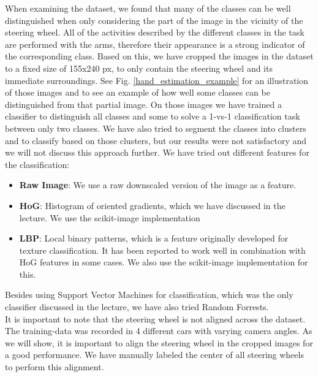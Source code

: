 \documentclass[10pt,twocolumn,letterpaper]{article}
\begin{document}
When examining the dataset, we found that many of the classes can be well distinguished when only considering the part of the image in the vicinity of the steering wheel. All of the activities described by the different classes in the task are performed with the arms, therefore their appearance is a strong indicator of the corresponding class. Based on this, we have cropped the images in the dataset to a fixed size of 155x240 px, to only contain the steering wheel and its immediate surroundings. See Fig. \ref{hand_estimation_example} for an illustration of those images and to see an example of how well some classes can be distinguished from that partial image. On those images we have trained a classifier to distinguish all classes and some to solve a 1-vs-1 classification task between only two classes. We have also tried to segment the classes into clusters and to classify based on those clusters, but our results were not satisfactory and we will not discuss this approach further. We have tried out different features for the classification:
\begin{itemize}
	\item \textbf{Raw Image}: We use a raw downscaled version of the image as a feature.
	\item \textbf{HoG}: Histogram of oriented gradients, which we have discussed in the lecture. We use the scikit-image implementation
	\item \textbf{LBP}: Local binary patterns, which is a feature originally developed for texture classification. It has been reported to work well in combination with HoG features in some cases. We also use the scikit-image implementation for this.
\end{itemize}
Besides using Support Vector Machines for classification, which was the only classifier discussed in the lecture, we have also tried Random Forrests.\\
It is important to note that the steering wheel is not aligned across the dataset. The training-data was recorded in 4 different cars with varying camera angles. As we will show, it is important to align the steering wheel in the cropped images for a good performance. We have manually labeled the center of all steering wheels to perform this alignment.
\end{document}
